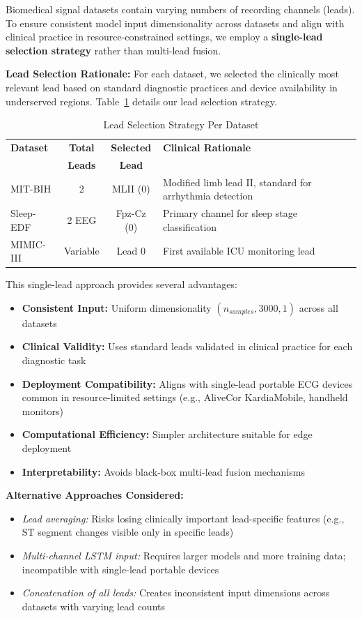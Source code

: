 \documentclass[conference]{IEEEtran}
\begin{document}
Biomedical signal datasets contain varying numbers of recording channels (leads). To ensure consistent model input dimensionality across datasets and align with clinical practice in resource-constrained settings, we employ a \textbf{single-lead selection strategy} rather than multi-lead fusion.

\textbf{Lead Selection Rationale:} For each dataset, we selected the clinically most relevant lead based on standard diagnostic practices and device availability in underserved regions. Table~\ref{tab:lead_selection} details our lead selection strategy.

\begin{table}[htbp]
\caption{Lead Selection Strategy Per Dataset}
\label{tab:lead_selection}
\centering
\begin{tabular}{lccp{4cm}}
\toprule
\textbf{Dataset} & \textbf{Total} & \textbf{Selected} & \textbf{Clinical Rationale} \\
 & \textbf{Leads} & \textbf{Lead} & \\
\midrule
MIT-BIH & 2 & MLII (0) & Modified limb lead II, standard for arrhythmia detection \\
Sleep-EDF & 2 EEG & Fpz-Cz (0) & Primary channel for sleep stage classification \\
MIMIC-III & Variable & Lead 0 & First available ICU monitoring lead \\
\bottomrule
\end{tabular}
\end{table}

This single-lead approach provides several advantages:
\begin{itemize}
\item \textbf{Consistent Input:} Uniform dimensionality $(n_{samples}, 3000, 1)$ across all datasets
\item \textbf{Clinical Validity:} Uses standard leads validated in clinical practice for each diagnostic task
\item \textbf{Deployment Compatibility:} Aligns with single-lead portable ECG devices common in resource-limited settings (e.g., AliveCor KardiaMobile, handheld monitors)
\item \textbf{Computational Efficiency:} Simpler architecture suitable for edge deployment
\item \textbf{Interpretability:} Avoids black-box multi-lead fusion mechanisms
\end{itemize}

\textbf{Alternative Approaches Considered:}
\begin{itemize}
\item \textit{Lead averaging:} Risks losing clinically important lead-specific features (e.g., ST segment changes visible only in specific leads)
\item \textit{Multi-channel LSTM input:} Requires larger models and more training data; incompatible with single-lead portable devices
\item \textit{Concatenation of all leads:} Creates inconsistent input dimensions across datasets with varying lead counts
\end{itemize}
\end{document}
